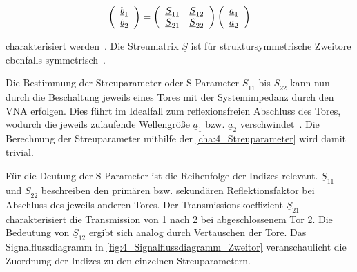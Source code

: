 \begin{equation}
\centering
    \left(\begin{array}{c}\underline{b}_1 \\ \underline{b}_2 \end{array}\right) = \left(\begin{array}{cc}\underline{S}_{11} & \underline{S}_{12} \\ \underline{S}_{21} & \underline{S}_{22} \end{array}\right) \left(\begin{array}{c}\underline{a}_{1} \\ \underline{a}_{2} \end{array}\right) \label{cha:4_Streuparameter}
\end{equation}

charakterisiert werden~\cite{Taschenbuch_HF-Technik}. Die Streumatrix $\underline{S}$ ist für struktursymmetrische Zweitore ebenfalls symmetrisch~\cite{Grundkurs_Hochfrequenztechnik}.  
\par
\vspace{\linespace}
Die Bestimmung der Streuparameter oder S-Parameter $\underline{S}_{11}$ bis $\underline{S}_{22}$ kann nun durch die Beschaltung jeweils eines Tores mit der Systemimpedanz durch den VNA erfolgen. Dies führt im Idealfall zum reflexionsfreien Abschluss des Tores, wodurch die jeweils zulaufende Wellengröße $\underline{a}_1$ bzw. $\underline{a}_2$ verschwindet~\cite{Grundkurs_Hochfrequenztechnik}. Die Berechnung der Streuparameter mithilfe der \Gleichung\eqref{cha:4_Streuparameter} wird damit trivial. 
\par
\vspace{\linespace}
Für die Deutung der S-Parameter ist die Reihenfolge der Indizes relevant. $\underline{S}_{11}$ und $\underline{S}_{22}$ beschreiben den primären bzw. sekundären Reflektionsfaktor bei Abschluss des jeweils anderen Tores. Der Transmissionskoeffizient $\underline{S}_{21}$ charakterisiert die Transmission von 1 nach 2 bei abgeschlossenem Tor 2. Die Bedeutung von $\underline{S}_{12}$ ergibt sich analog durch Vertauschen der Tore. Das Signalflussdiagramm in \Abb\ref{fig:4_Signalflussdiagramm_Zweitor} veranschaulicht die Zuordnung der Indizes zu den einzelnen Streuparametern.
\par
\vspace{\linespace}

